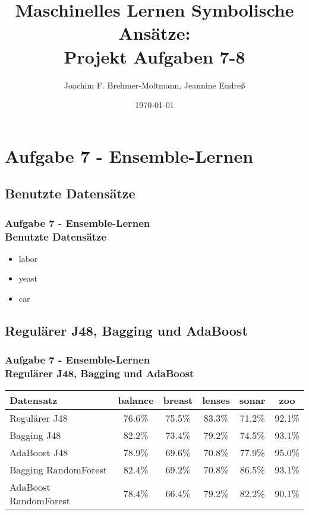 \documentclass[accentcolor=tud10b,colorbacktitle,inverttitle,landscape,german,presentation,t]{tudbeamer}
\begin{document}
\title[MLDM: Projekt Aufg 7-8]{Maschinelles Lernen Symbolische Ansätze:\\ Projekt Aufgaben 7-8}
\subtitle{}

\author[brehmer\_endreß]{Joachim F. Brehmer-Moltmann, Jeannine Endreß}

\date{\today}

\begin{titleframe}
\tableofcontents
\end{titleframe}

    \section{Aufgabe 7 - Ensemble-Lernen}
    
    \subsection{Benutzte Datensätze}
    
    \begin{frame}[t]
    \frametitle{Aufgabe 7 - Ensemble-Lernen\\ Benutzte Datensätze}
        \begin{itemize}
            \item labor
            \item yeast
            \item car
        \end{itemize}
    \end{frame}
    
    \subsection{Regulärer J48, Bagging und AdaBoost}
    
    \begin{frame}[t]
    \frametitle{Aufgabe 7 - Ensemble-Lernen\\ Regulärer J48, Bagging und AdaBoost}
        \begin{tabular}[htbp]{l||c|c|c|c|c}
            Datensatz & balance & breast & lenses & sonar & zoo \\
            \hline
            \hline
            Regulärer J48 & 76.6\% & 75.5\% & 83.3\% & 71.2\% & 92.1\% \\
            \hline
            Bagging J48 & 82.2\% & 73.4\% & 79.2\% & 74.5\% & 93.1\% \\
            \hline
            AdaBoost J48 & 78.9\% & 69.6\% & 70.8\% & 77.9\% & 95.0\% \\
            \hline
            Bagging RandomForest & 82.4\% & 69.2\% & 70.8\% & 86.5\% & 93.1\% \\
            \hline
            AdaBoost RandomForest & 78.4\% & 66.4\% & 79.2\% & 82.2\% & 90.1\%
        \end{tabular}
    \end{frame}
    
\end{document}

